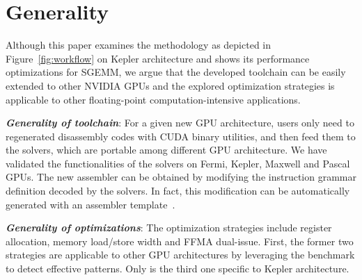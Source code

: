 \section{Generality}
\label{sec:generality}

Although this paper examines the methodology as depicted in Figure~\ref{fig:workflow} on Kepler architecture and shows its performance optimizations for SGEMM, we argue that the developed toolchain can be easily extended to other NVIDIA GPUs and the explored optimization strategies is applicable to other floating-point computation-intensive applications.

{\em {\bf Generality of toolchain}}: For a given new GPU architecture, users only need to regenerated disassembly codes with CUDA binary utilities, and then feed them to the solvers, which are portable among different GPU architecture. We have validated the functionalities of the solvers on Fermi, Kepler, Maxwell and Pascal GPUs. The new assembler can be obtained by modifying the instruction grammar definition decoded by the solvers. In fact, this modification can be automatically generated with an assembler template~\cite{}. 

{\em {\bf Generality of optimizations}}: The optimization strategies include register allocation, memory load/store width and FFMA dual-issue. First, the former two strategies are applicable to other GPU architectures by leveraging the benchmark to detect effective patterns. Only is the third one specific to Kepler architecture. 


